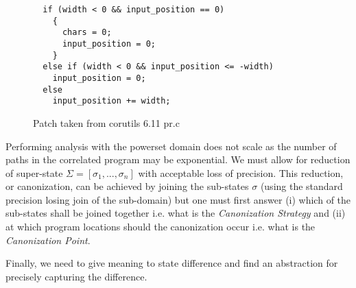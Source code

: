 \begin{figure}
\centering
\begin{lstlisting}
  if (width < 0 && input_position == 0)
    {
      chars = 0;
      input_position = 0;
    }
  else if (width < 0 && input_position <= -width)
    input_position = 0;
  else
    input_position += width;
\end{lstlisting}
\caption{Patch taken from corutils 6.11 pr.c}
\end{figure}

Performing analysis with the powerset domain does not scale as the number of paths in the correlated program may be exponential. We must allow for reduction of super-state $\Sigma = [\sigma_1,...,\sigma_n]$ with acceptable loss of precision. This reduction, or canonization, can be achieved by joining the sub-states $\sigma$ (using the standard precision losing join of the sub-domain) but one must first answer (i) which of the sub-states shall be joined together i.e. what is the \emph{Canonization Strategy} and (ii) at which program locations should the canonization occur i.e. what is the \emph{Canonization Point}. %


Finally, we need to give meaning to state difference and find an abstraction for precisely capturing the difference. 

